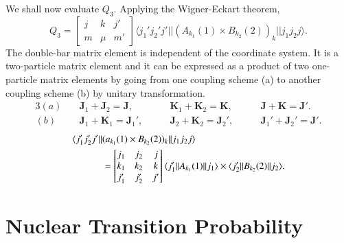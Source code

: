 We shall now evaluate $Q_3$. Applying the Wigner-Eckart theorem,
\begin{equation}
  Q_3 =
  \begin{bmatrix}    j & k & j'\\    m & \mu & m'  \end{bmatrix}
  \langle j_1' j_2' j' || (A_{k_1}(1) \times B_{k_2}(2))_k || j_1 j_2 j \rangle. \label{chap3-eq22}
\end{equation}
The double-bar matrix element is independent of the coordinate system. It is a two-particle matrix element and it can be expressed as a product of two one-particle matrix elements by going from one coupling scheme (a) to another coupling scheme (b) by unitary transformation.
\begin{alignat*}{3}
  (a) \quad&  {\boldsymbol  J}_1 + {\boldsymbol  J}_2 = {\boldsymbol  J}, \qquad &{\boldsymbol  K}_1+ {\boldsymbol  K}_2= {\boldsymbol  K}, \qquad &{\boldsymbol  J} + {\boldsymbol  K}= {\boldsymbol  J}'.\\
  (b) \quad &{\boldsymbol  J}_1 + {\boldsymbol  K}_1 = {\boldsymbol  J}_1', \qquad &{\boldsymbol  J}_2+{\boldsymbol  K}_2= {\boldsymbol  J}_2', \qquad & {\boldsymbol  J}_1'+{\boldsymbol  J}_2'={\boldsymbol  J}'.
\end{alignat*}
\begin{align}
  \langle j_1' j_2' j' || & (a_{k_1}(1) \times B_{k_2}(2))_k ||  j_1 j_2 j \rangle \notag \\
  & =  \begin{bmatrix} j_1 & j_2 & j\\ k_1 & k_2 & k \\ j_1' & j_2' & j'  \end{bmatrix}
  \langle j_1' || A_{k_1}(1)|| j_1 \rangle \times \langle j_2' || B_{k_2} (2)|| j_2 \rangle . \label{chap3-eq23}
\end{align}

\section{Nuclear Transition Probability}\label{chap3-sec3}

